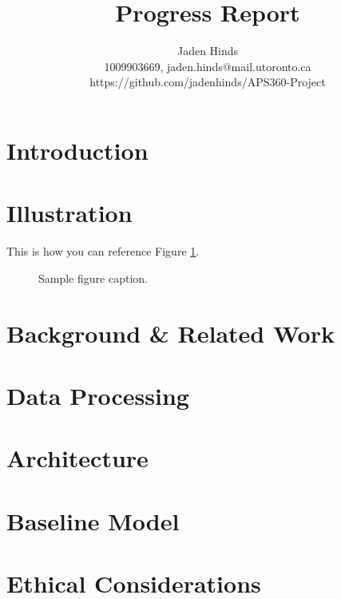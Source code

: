 \documentclass[final]{article}
\title{Progress Report}
\author{%
  Jaden Hinds \\
  1009903669, jaden.hinds@mail.utoronto.ca\\
  https://github.com/jadenhinds/APS360-Project\\
}
\begin{document}
\maketitle

\vspace{-0.5in}

\section*{Introduction}

\section*{Illustration}
This is how you can reference Figure \ref{fig:sample}.

\begin{figure}[!h]
  \centering
  \fbox{\rule[-.5cm]{0cm}{4cm} \rule[-.5cm]{4cm}{0cm}}
  \caption{Sample figure caption.}
  \label{fig:sample}
\end{figure}

\section*{Background \& Related Work}

\section*{Data Processing}

\section*{Architecture}

\section*{Baseline Model}

\section*{Ethical Considerations}

\newpage
\nocite{*}
\end{document}
